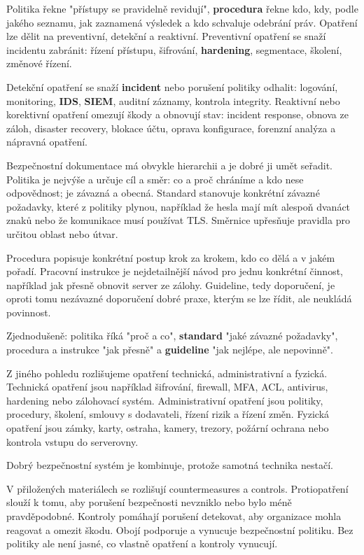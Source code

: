 \documentclass[11pt,a4paper]{article}
\begin{document}
Politika řekne "přístupy se pravidelně revidují", \textbf{procedura} řekne kdo, kdy, podle jakého seznamu, jak zaznamená výsledek a kdo schvaluje odebrání práv. Opatření lze dělit na preventivní, detekční a reaktivní. Preventivní opatření se snaží incidentu zabránit: řízení přístupu, šifrování, \textbf{hardening}, segmentace, školení, změnové řízení.

Detekční opatření se snaží \textbf{incident} nebo porušení politiky odhalit: logování, monitoring, \textbf{IDS}, \textbf{SIEM}, auditní záznamy, kontrola integrity. Reaktivní nebo korektivní opatření omezují škody a obnovují stav: incident response, obnova ze záloh, disaster recovery, blokace účtu, oprava konfigurace, forenzní analýza a nápravná opatření.

Bezpečnostní dokumentace má obvykle hierarchii a je dobré ji umět seřadit. Politika je nejvýše a určuje cíl a směr: co a proč chráníme a kdo nese odpovědnost; je závazná a obecná. Standard stanovuje konkrétní závazné požadavky, které z politiky plynou, například že hesla mají mít alespoň dvanáct znaků nebo že komunikace musí používat TLS. Směrnice upřesňuje pravidla pro určitou oblast nebo útvar.

Procedura popisuje konkrétní postup krok za krokem, kdo co dělá a v jakém pořadí. Pracovní instrukce je nejdetailnější návod pro jednu konkrétní činnost, například jak přesně obnovit server ze zálohy. Guideline, tedy doporučení, je oproti tomu nezávazné doporučení dobré praxe, kterým se lze řídit, ale neukládá povinnost.

Zjednodušeně: politika říká "proč a co", \textbf{standard} "jaké závazné požadavky", procedura a instrukce "jak přesně" a \textbf{guideline} "jak nejlépe, ale nepovinně".

Z jiného pohledu rozlišujeme opatření technická, administrativní a fyzická. Technická opatření jsou například šifrování, firewall, MFA, ACL, antivirus, hardening nebo zálohovací systém. Administrativní opatření jsou politiky, procedury, školení, smlouvy s dodavateli, řízení rizik a řízení změn. Fyzická opatření jsou zámky, karty, ostraha, kamery, trezory, požární ochrana nebo kontrola vstupu do serverovny.

Dobrý bezpečnostní systém je kombinuje, protože samotná technika nestačí.

V přiložených materiálech se rozlišují countermeasures a controls. Protiopatření slouží k tomu, aby porušení bezpečnosti nevzniklo nebo bylo méně pravděpodobné. Kontroly pomáhají porušení detekovat, aby organizace mohla reagovat a omezit škodu. Obojí podporuje a vynucuje bezpečnostní politiku. Bez politiky ale není jasné, co vlastně opatření a kontroly vynucují.
\end{document}
